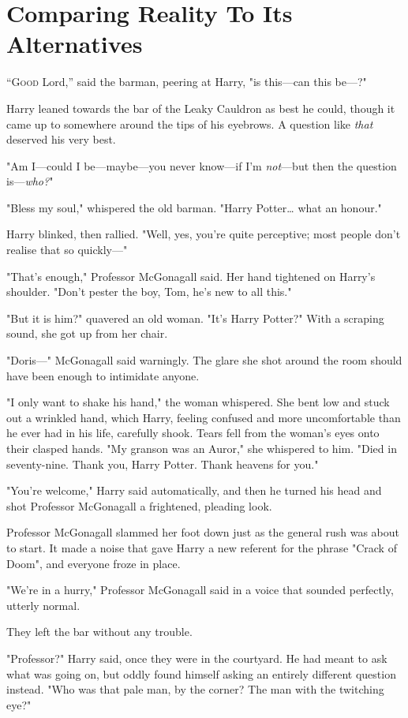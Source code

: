 \chapter{Comparing Reality To Its Alternatives}

\lettrine{“G}{ood} Lord,'' said the barman, peering at Harry, "is this---can this be---?"

Harry leaned towards the bar of the Leaky Cauldron as best he could, though it 
came up to somewhere around the tips of his eyebrows. A question like 
\emph{that} deserved his very best.

"Am I---could I be---maybe---you never know---if I'm\emph{ not}---but then the 
question is---\emph{who?}"

"Bless my soul," whispered the old barman. "Harry Potter{\ldots} what an 
honour."

Harry blinked, then rallied. "Well, yes, you're quite perceptive; most people 
don't realise that so quickly---"

"That's enough," Professor McGonagall said. Her hand tightened on Harry's 
shoulder. "Don't pester the boy, Tom, he's new to all this."

"But it is him?" quavered an old woman. "It's Harry Potter?" With a scraping 
sound, she got up from her chair.

"Doris---" McGonagall said warningly. The glare she shot around the room should 
have been enough to intimidate anyone.

"I only want to shake his hand," the woman whispered. She bent low and stuck 
out a wrinkled hand, which Harry, feeling confused and more uncomfortable than 
he ever had in his life, carefully shook. Tears fell from the woman's eyes onto 
their clasped hands. "My granson was an Auror," she whispered to him. "Died in 
seventy-nine. Thank you, Harry Potter. Thank heavens for you."

"You're welcome," Harry said automatically, and then he turned his head and 
shot Professor McGonagall a frightened, pleading look.

Professor McGonagall slammed her foot down just as the general rush was about 
to start. It made a noise that gave Harry a new referent for the phrase "Crack 
of Doom", and everyone froze in place.

"We're in a hurry," Professor McGonagall said in a voice that sounded 
perfectly, utterly normal.

They left the bar without any trouble.

"Professor?" Harry said, once they were in the courtyard. He had meant to ask 
what was going on, but oddly found himself asking an entirely different 
question instead. "Who was that pale man, by the corner? The man with the 
twitching eye?"

